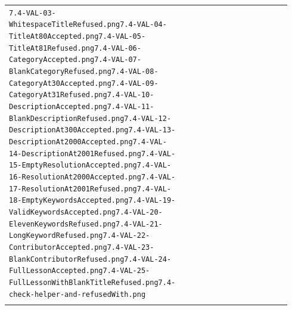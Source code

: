 \documentclass[10pt]{article}
\begin{document}
\begin{longtable}{@{}>{\raggedright\arraybackslash}p{0.07\linewidth} >{\raggedright\arraybackslash}p{0.33\linewidth} >{\raggedright\arraybackslash}p{0.54\linewidth}@{}}
\texttt{7.4-VAL-03-WhitespaceTitleRefused.png}\newline \texttt{7.4-VAL-04-TitleAt80Accepted.png}\newline \texttt{7.4-VAL-05-TitleAt81Refused.png}\newline \texttt{7.4-VAL-06-CategoryAccepted.png}\newline \texttt{7.4-VAL-07-BlankCategoryRefused.png}\newline \texttt{7.4-VAL-08-CategoryAt30Accepted.png}\newline \texttt{7.4-VAL-09-CategoryAt31Refused.png}\newline \texttt{7.4-VAL-10-DescriptionAccepted.png}\newline \texttt{7.4-VAL-11-BlankDescriptionRefused.png}\newline \texttt{7.4-VAL-12-DescriptionAt300Accepted.png}\newline \texttt{7.4-VAL-13-DescriptionAt2000Accepted.png}\newline \texttt{7.4-VAL-14-DescriptionAt2001Refused.png}\newline \texttt{7.4-VAL-15-EmptyResolutionAccepted.png}\newline \texttt{7.4-VAL-16-ResolutionAt2000Accepted.png}\newline \texttt{7.4-VAL-17-ResolutionAt2001Refused.png}\newline \texttt{7.4-VAL-18-EmptyKeywordsAccepted.png}\newline \texttt{7.4-VAL-19-ValidKeywordsAccepted.png}\newline \texttt{7.4-VAL-20-ElevenKeywordsRefused.png}\newline \texttt{7.4-VAL-21-LongKeywordRefused.png}\newline \texttt{7.4-VAL-22-ContributorAccepted.png}\newline \texttt{7.4-VAL-23-BlankContributorRefused.png}\newline \texttt{7.4-VAL-24-FullLessonAccepted.png}\newline \texttt{7.4-VAL-25-FullLessonWithBlankTitleRefused.png}\newline \texttt{7.4-check-helper-and-refusedWith.png}} \\ \addlinespace[3pt]
\bottomrule\end{longtable}



\end{document}
